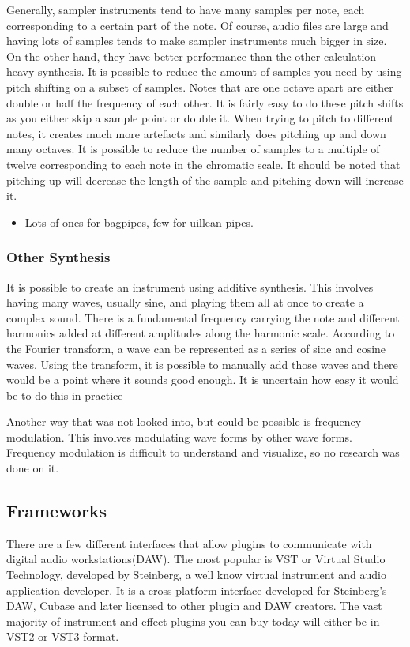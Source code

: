 \documentclass[12pt]{article}
\begin{document}
	Generally, sampler instruments tend to have many samples per note, each corresponding to a certain part of the note. Of course, audio files are large and having lots of samples
	tends to make sampler instruments much bigger in size. On the other hand, they have better performance than the other calculation heavy synthesis. It is possible to reduce
	the amount of samples you need by using pitch shifting on a subset of samples. Notes that are one octave apart are either double or half the frequency of each other. It is 
	fairly easy to do these pitch shifts as you either skip a sample point or double it. When trying to pitch to different notes, it creates much more artefacts and similarly 
	does pitching up and down many octaves. It is possible to reduce the number of samples to a multiple of twelve corresponding to each note in the chromatic scale. 
	It should be noted that pitching up will decrease the length of the sample and pitching down will increase it.
	
	\begin{itemize}
		\item Lots of ones for bagpipes, few for uillean pipes.
	\end{itemize}
	

	\subsubsection{Other Synthesis}
	It is possible to create an instrument using additive synthesis. This involves having many waves, usually sine, and playing them all at once to create a complex sound.
	There is a fundamental frequency carrying the note and different harmonics added at different amplitudes along the harmonic scale. According to the Fourier transform, a wave 
	can be represented as a series of sine and cosine waves. Using the transform, it is possible to manually add those waves and there would be a point where it sounds good
	enough. It is uncertain how easy it would be to do this in practice
	
	Another way that was not looked into, but could be possible is frequency modulation. This involves modulating wave forms by other wave forms. Frequency modulation is
	difficult to understand and visualize, so no research was done on it.
	


	\subsection{Frameworks}
	There are a few different interfaces that allow plugins to communicate with digital audio workstations(DAW). 
	The most popular is VST or Virtual Studio Technology, developed by Steinberg, a well know virtual instrument and audio application developer. 
	It is a cross platform interface developed for Steinberg's DAW, Cubase and later licensed to other plugin and DAW creators.
	The vast majority of instrument and effect plugins you can buy today will either be in VST2 or VST3 format. 
	
\end{document}
